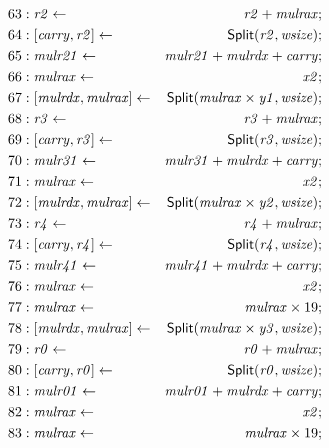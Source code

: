 {\begin{multicols}{2}
\begin{align*}
63 &: \mathit{r2} \leftarrow & \mathit{r2} + \mathit{mulrax}; \\
64 &: \concat{\mathit{carry}}{\mathit{r2}} \leftarrow & \dslcode{Split}(\mathit{r2}, \mathit{wsize}); \\
65 &: \mathit{mulr21} \leftarrow & \mathit{mulr21} + \mathit{mulrdx} + \mathit{carry}; \\
66 &: \mathit{mulrax} \leftarrow & \mathit{x2}; \\
67 &: \concat{\mathit{mulrdx}}{\mathit{mulrax}} \leftarrow & \dslcode{Split}(\mathit{mulrax} \times \mathit{y1}, \mathit{wsize}); \\
68 &: \mathit{r3} \leftarrow & \mathit{r3} + \mathit{mulrax}; \\
69 &: \concat{\mathit{carry}}{\mathit{r3}} \leftarrow & \dslcode{Split}(\mathit{r3}, \mathit{wsize}); \\
70 &: \mathit{mulr31} \leftarrow & \mathit{mulr31} + \mathit{mulrdx} + \mathit{carry}; \\
71 &: \mathit{mulrax} \leftarrow & \mathit{x2}; \\
72 &: \concat{\mathit{mulrdx}}{\mathit{mulrax}} \leftarrow & \dslcode{Split}(\mathit{mulrax} \times \mathit{y2}, \mathit{wsize}); \\
73 &: \mathit{r4} \leftarrow & \mathit{r4} + \mathit{mulrax}; \\
74 &: \concat{\mathit{carry}}{\mathit{r4}} \leftarrow & \dslcode{Split}(\mathit{r4}, \mathit{wsize}); \\
75 &: \mathit{mulr41} \leftarrow & \mathit{mulr41} + \mathit{mulrdx} + \mathit{carry}; \\
76 &: \mathit{mulrax} \leftarrow & \mathit{x2}; \\
77 &: \mathit{mulrax} \leftarrow & \mathit{mulrax} \times 19; \\
78 &: \concat{\mathit{mulrdx}}{\mathit{mulrax}} \leftarrow & \dslcode{Split}(\mathit{mulrax} \times \mathit{y3}, \mathit{wsize}); \\
79 &: \mathit{r0} \leftarrow & \mathit{r0} + \mathit{mulrax}; \\
80 &: \concat{\mathit{carry}}{\mathit{r0}} \leftarrow & \dslcode{Split}(\mathit{r0}, \mathit{wsize}); \\
81 &: \mathit{mulr01} \leftarrow & \mathit{mulr01} + \mathit{mulrdx} + \mathit{carry}; \\
82 &: \mathit{mulrax} \leftarrow & \mathit{x2}; \\
83 &: \mathit{mulrax} \leftarrow & \mathit{mulrax} \times 19; \\

\end{align*}
\end{multicols}}
